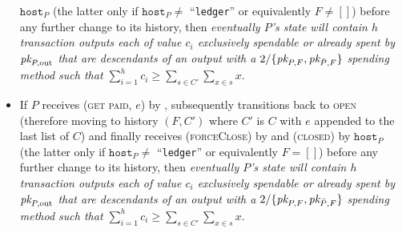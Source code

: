 \begin{itemize}
    $\texttt{host}_P$ (the latter only if $\texttt{host}_P \neq$ ``\texttt{ledger}'' or
    equivalently $F \neq []$) before any further change to its history, then
    \emph{eventually $P$'s \ledger state will contain $h$ transaction outputs
    each of value $c_i$ exclusively spendable or already spent by $\textit{pk}_{P,
    \mathrm{out}}$ that are descendants of an output with a $2/\{\textit{pk}_{P, F},
    \textit{pk}_{\bar{P}, F}\}$ spending method such that $\sum\limits_{i=1}^h c_i \geq
    \sum\limits_{s \in C'} \sum\limits_{x \in s} x$}.
    \item If $P$ receives (\textsc{get paid}, $e$) by \environment, subsequently
    transitions back to \textsc{open} (therefore moving to history $(F, C')$
    where $C'$ is $C$ with $e$ appended to the last list of $C$) and finally
    receives (\textsc{forceClose}) by \environment and (\textsc{closed}) by
    $\texttt{host}_P$ (the latter only if $\texttt{host}_P \neq$ ``\texttt{ledger}'' or
    equivalently $F = []$) before any further change to its history, then
    \emph{eventually $P$'s \ledger state will contain $h$ transaction outputs
    each of value $c_i$ exclusively spendable or already spent by $\textit{pk}_{P,
    \mathrm{out}}$ that are descendants of an output with a $2/\{\textit{pk}_{P, F},
    \textit{pk}_{\bar{P}, F}\}$ spending method such that $\sum\limits_{i=1}^h c_i \geq
    \sum\limits_{s \in C'} \sum\limits_{x \in s} x$}.
  \end{itemize}

